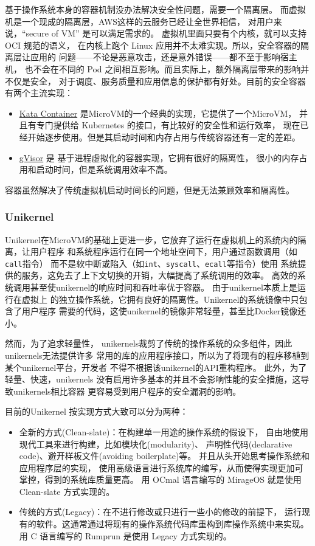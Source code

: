 \documentclass{../runikraft-report}
\begin{document}
基于操作系统本身的容器机制没办法解决安全性问题，需要一个隔离层。
而虚拟机是一个现成的隔离层，AWS这样的云服务已经让全世界相信，
对用户来说，“secure of VM” 是可以满足需求的。
虚拟机里面只要有个内核，就可以支持 OCI 规范的语义，
在内核上跑个 Linux 应用并不太难实现。所以，安全容器的隔离层让应用的
问题——不论是恶意攻击，还是意外错误——都不至于影响宿主机，
也不会在不同的 Pod 之间相互影响。而且实际上，额外隔离层带来的影响并不仅是安全，
对于调度、服务质量和应用信息的保护都有好处。目前的安全容器有两个主流实现：
\begin{itemize}
\item \href{https://github.com/kata-containers/kata-containers}{Kata Container} 是MicroVM的一个经典的实现，它提供了一个MicroVM，
并且有专门提供给 Kubernetes 的接口，有比较好的安全性和运行效率，
现在已经开始逐步使用。但是其启动时间和内存占用与传统容器还有一定的差距。
\item  \href{https://github.com/google/gvisor}{gVisor} 是
基于进程虚拟化的容器实现，它拥有很好的隔离性，
很小的内存占用和启动时间，但是系统调用效率不高。
\end{itemize}

容器虽然解决了传统虚拟机启动时间长的问题，但是无法兼顾效率和隔离性。

\subsubsection{Unikernel}
Unikernel在MicroVM的基础上更进一步，它放弃了运行在虚拟机上的系统内的隔离，让用户程序
和系统程序运行在同一个地址空间下，用户通过函数调用（如\texttt{call}指令）
而不是软中断或陷入（如\texttt{int}、\texttt{syscall}、\texttt{ecall}等指令）使用
系统提供的服务，这免去了上下文切换的开销，大幅提高了系统调用的效率。
高效的系统调用甚至使unikernel的响应时间和吞吐率优于容器。
由于unikernel本质上是运行在虚拟上
的独立操作系统，它拥有良好的隔离性。Unikernel的系统镜像中只包含了用户程序
需要的代码，这使unikernel的镜像非常轻量，甚至比Docker镜像还小。

然而，为了追求轻量性，
unikernels裁剪了传统的操作系统的众多组件，因此unikernels无法提供许多
常用的库的应用程序接口，所以为了将现有的程序移植到某个unikernel平台，开发者
不得不根据该unikernel的API重构程序。\cite{bib:unikraft}
此外，为了轻量、快速，unikernels
没有启用许多基本的并且不会影响性能的安全措施，这导致unikernels相比容器
更容易受到用户程序的安全漏洞的影响。\cite{bib:unikernel-secuirty}

目前的Unikernel 按实现方式大致可以分为两种：
\begin{itemize}
\item 全新的方式(Clean-slate)：在构建单一用途的操作系统的假设下，
自由地使用现代工具来进行构建，比如模块化(modularity)、
声明性代码(declarative code)、避开样板文件(avoiding boilerplate)等。
并且从头开始思考操作系统和应用程序层的实现，
使用高级语言进行系统库的编写，从而使得实现更加可掌控，得到的系统库质量更高。
用 OCmal 语言编写的 MirageOS 就是使用 Clean-slate 方式实现的。
\item 传统的方式(Legacy)：在不进行修改或只进行一些小的修改的前提下，
运行现有的软件。这通常通过将现有的操作系统代码库重构到库操作系统中来实现。
用 C 语言编写的 Rumprun 是使用 Legacy 方式实现的。
\end{itemize}
\end{document}
